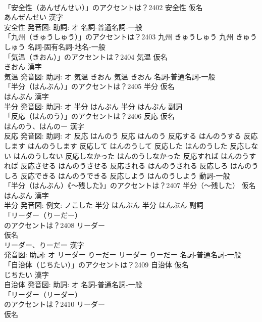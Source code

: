 \documentclass[8pt]{extreport}
\begin{document}
\begin{CJK}{UTF8}{min}
\\	「安全性（あんぜんせい）」のアクセントは？2402	安全性 仮名　
\\	あんぜんせい 漢字　
\\	安全性 発音図: 助詞: オ							名詞-普通名詞-一般 
\\	「九州（きゅうしゅう）」のアクセントは？2403		九州 きゅうしゅう		九州 きゅうしゅう				名詞-固有名詞-地名-一般 
\\	「気温（きおん）」のアクセントは？2404	気温 仮名　
\\	きおん 漢字　
\\	気温 発音図: 助詞: オ	気温 きおん		気温 きおん				名詞-普通名詞-一般 
\\	「半分（はんぶん）」のアクセントは？2405	半分 仮名　
\\	はんぶん 漢字　
\\	半分 発音図: 助詞: オ	半分 はんぶん		半分 はんぶん				副詞 
\\	「反応（はんのう）」のアクセントは？2406	反応 仮名　
\\	はんのう、はんのー 漢字　
\\	反応 発音図: 助詞: オ	反応 はんのう		反応 はんのう 反応する はんのうする 反応します はんのうします 反応して はんのうして 反応した はんのうした 反応しない はんのうしない 反応しなかった はんのうしなかった 反応すれば はんのうすれば 反応させる はんのうさせる 反応される はんのうされる 反応しろ はんのうしろ 反応できる はんのうできる 反応しよう はんのうしよう				動詞-一般 
\\	「半分（はんぶん）《〜残した》」のアクセントは？2407	半分（〜残した） 仮名　
\\	はんぶん 漢字　
\\	半分 発音図: 例文: ノこした	半分 はんぶん		半分 はんぶん				副詞 
\\	「リーダー（りーだー）
\\	のアクセントは？2408	リーダー
\\	仮名　
\\	リーダー、りーだー 漢字　
\\	発音図: 助詞: オ	リーダー りーだー		リーダー りーだー				名詞-普通名詞-一般 
\\	「自治体（じちたい）」のアクセントは？2409	自治体 仮名　
\\	じちたい 漢字　
\\	自治体 発音図: 助詞: オ							名詞-普通名詞-一般 
\\	「リーダー（リーダー）
\\	のアクセントは？2410	リーダー
\\	仮名　

\end{CJK}
\end{document}
